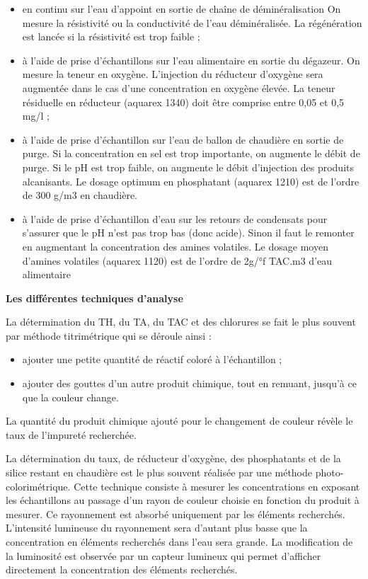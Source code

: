 \begin{itemize}
\item en continu sur l’eau d’appoint en sortie de chaîne de déminéralisation On mesure la résistivité ou la conductivité de l’eau déminéralisée. La régénération est lancée si la résistivité est trop faible ;
\item  à l’aide de prise d’échantillons sur l’eau alimentaire en sortie du dégazeur. On mesure la teneur en oxygène. L’injection du réducteur d’oxygène sera augmentée dans le cas d’une concentration en oxygène élevée. La teneur résiduelle en réducteur (aquarex 1340) doit être comprise entre 0,05 et 0,5 mg/l ;
\item  à l’aide de prise d’échantillon sur l’eau de ballon de chaudière en sortie de purge. Si la concentration en sel est trop importante, on augmente le débit de purge. Si le pH est trop faible, on augmente le débit d’injection des produits alcanisants. Le dosage optimum en phosphatant (aquarex 1210) est de l’ordre de 300 g/m3 en chaudière.
\item  à l’aide de prise d’échantillon d’eau sur les retours de condensats pour s’assurer que le pH n’est pas trop bas (donc acide). Sinon il faut le remonter en augmentant la concentration des amines volatiles. Le dosage moyen d’amines volatiles (aquarex 1120) est de l’ordre de 2g/°f TAC.m3 d’eau alimentaire

\end{itemize}

\vspace{0.3cm}
\textbf{Les différentes techniques d'analyse}
\vspace{0.3cm}

La détermination du TH, du TA, du TAC et des chlorures se fait le plus souvent par méthode titrimétrique qui se déroule ainsi :


\begin{itemize}
\item ajouter une petite quantité de réactif coloré à l'échantillon ;
\item ajouter des gouttes d'un autre produit chimique, tout en remuant, jusqu'à ce que la couleur change.
\end{itemize}

La quantité du produit chimique ajouté pour le changement de couleur révèle le taux de l’impureté recherchée.

\vspace{0.3cm}

La détermination du taux, de réducteur d’oxygène, des phosphatants et de la silice restant en chaudière est le plus souvent réalisée par une méthode photo-colorimétrique. Cette technique consiste à mesurer les concentrations en exposant les échantillons au passage d’un rayon de couleur choisie en fonction du produit à mesurer. Ce rayonnement est absorbé uniquement par les éléments recherchés. L’intensité lumineuse du rayonnement sera d’autant plus basse que la concentration en éléments recherchés dans l’eau sera grande.
La modification de la luminosité est observée par un capteur lumineux qui permet d’afficher directement la concentration des éléments recherchés.
\vspace{0.3cm}

